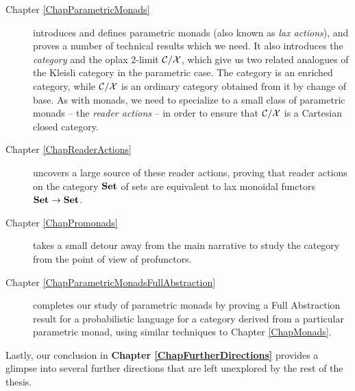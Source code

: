 \documentclass[11pt]{report}
\begin{document}
\begin{description}
  \item[Chapter \ref{ChapParametricMonads}] introduces and defines parametric monads (also known as \emph{lax actions}), and proves a number of technical results which we need.
    It also introduces the \emph{\Mellies category} and the oplax $2$-limit ${\mathcal{C}}/\mathcal X$, which give us two related analogues of the Kleisli category in the parametric case.
    The \Mellies category is an enriched category, while ${\mathcal{C}}/\mathcal X$ is an ordinary category obtained from it by change of base.
    As with monads, we need to specialize to a small class of parametric monads -- the \emph{reader actions} -- in order to ensure that ${\mathcal{C}}/\mathcal X$ is a Cartesian closed category.
  \item[Chapter \ref{ChapReaderActions}] uncovers a large source of these reader actions, proving that reader actions on the category ${\normalfont\textbf{Set}}$ of sets are equivalent to lax monoidal functors ${\normalfont\textbf{Set}} \to {\normalfont\textbf{Set}}$.
  \item[Chapter \ref{ChapPromonads}] takes a small detour away from the main narrative to study the \Mellies category from the point of view of profunctors.
  \item[Chapter \ref{ChapParametricMonadsFullAbstraction}] completes our study of parametric monads by proving a Full Abstraction result for a probabilistic language for a category derived from a particular parametric monad, using similar techniques to Chapter \ref{ChapMonads}.
\end{description}
Lastly, our conclusion in {\bf Chapter \ref{ChapFurtherDirections}} provides a glimpse into several further directions that are left unexplored by the rest of the thesis.



\end{document}
